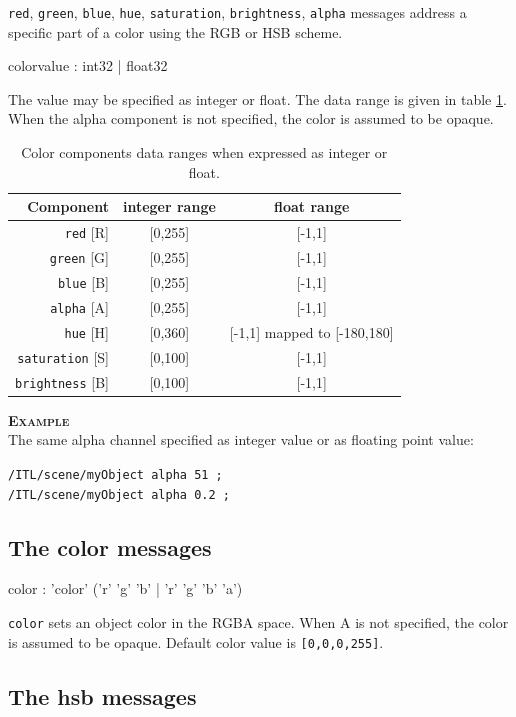 \documentclass[a4paper,twoside]{report}
\newcommand{\subsublevel}[1]	{\subsection{#1}}
\newcommand{\OSC}[1]		{\texttt{#1}}
\newcommand{\values}[1]		{\texttt{#1}}
\newcommand{\example}		{\textbf{\hspace{-1.5cm}\textbf{\textsc{Example }}}}
\newcommand{\sample}	[1]			{\vspace{-2mm}\begin{center}\colorbox{mygrey}{
								\begin{minipage}[t]{0.9\columnwidth} 
								{\small \texttt{#1}}
								\end{minipage}}\end{center}}
\begin{document}
\OSC{red}, \OSC{green}, \OSC{blue}, \OSC{hue}, \OSC{saturation}, \OSC{brightness}, \OSC{alpha} messages address a specific part of a color using the RGB or HSB scheme.

\begin{rail}
colorvalue :    int32 | float32
\end{rail}

The value may be specified as integer or float. The data range is given in table \ref{colorrange}.
When the alpha component is not specified, the color is assumed to be opaque. 

\begin{table}[htbp]
\begin{center}
\begin{tabular}{|r|c|c|}
\hline
Component & integer range & float range \\
\hline
\OSC{red} [R] 		& [0,255] & [-1,1] \\
\OSC{green} [G] 	& [0,255] & [-1,1] \\
\OSC{blue} [B]		& [0,255] & [-1,1] \\
\OSC{alpha} [A] 	& [0,255] & [-1,1] \\
\OSC{hue} [H] 		& [0,360] & [-1,1] mapped to [-180,180]\\
\OSC{saturation} [S] 	& [0,100] & [-1,1] \\
\OSC{brightness} [B] 	& [0,100] & [-1,1] \\
\hline
\end{tabular}
\end{center}
\caption{Color components data ranges when expressed as integer or float.}
\label{colorrange}
\end{table}%


\example \\
The same alpha channel specified as integer value or as floating point value:
\sample{/ITL/scene/myObject alpha 51 ;\\
/ITL/scene/myObject alpha 0.2 ;
}

\subsublevel{The color messages}

\begin{rail}
color :		'color' ('r' 'g' 'b' | 'r' 'g' 'b' 'a') 
\end{rail}

\OSC{color} sets an object color in the RGBA space.
When A is not specified, the color is assumed to be opaque. 
Default color value is \values{[0,0,0,255]}.


\subsublevel{The hsb messages}
\end{document}
